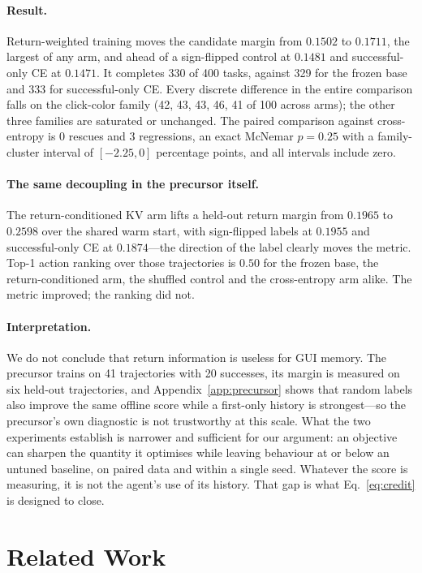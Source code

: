 \documentclass{article}
\begin{document}
\paragraph{Result.} Return-weighted training moves the candidate margin from
$0.1502$ to $0.1711$, the largest of any arm, and ahead of a sign-flipped
control at $0.1481$ and successful-only CE at $0.1471$. It completes 330 of 400
tasks, against 329 for the frozen base and 333 for successful-only CE. Every
discrete difference in the entire comparison falls on the click-color family
(42, 43, 43, 46, 41 of 100 across arms); the other three families are saturated
or unchanged. The paired comparison against cross-entropy is $0$ rescues and $3$
regressions, an exact McNemar $p=0.25$ with a family-cluster interval of
$[-2.25, 0]$ percentage points, and all intervals include zero.

\paragraph{The same decoupling in the precursor itself.} The return-conditioned
KV arm lifts a held-out return margin from $0.1965$ to $0.2598$ over the shared
warm start, with sign-flipped labels at $0.1955$ and successful-only CE at
$0.1874$---the direction of the label clearly moves the metric. Top-1 action
ranking over those trajectories is $0.50$ for the frozen base, the
return-conditioned arm, the shuffled control and the cross-entropy arm alike.
The metric improved; the ranking did not.

\paragraph{Interpretation.} We do not conclude that return information is
useless for GUI memory. The precursor trains on 41 trajectories with 20
successes, its margin is measured on six held-out trajectories, and Appendix~\ref{app:precursor}
shows that random labels also improve the same offline score while a first-only
history is strongest---so the precursor's own diagnostic is not trustworthy at
this scale. What the two experiments establish is narrower and sufficient for
our argument: an objective can sharpen the quantity it optimises while leaving
behaviour at or below an untuned baseline, on paired data and within a single
seed. Whatever the score is measuring, it is not the agent's use of its history.
That gap is what Eq.~\eqref{eq:credit} is designed to close.

\section{Related Work}
\label{sec:related}
\end{document}
